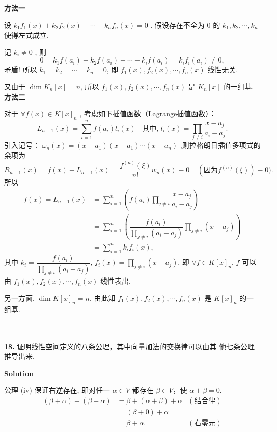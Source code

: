 \documentclass[11pt,a4paper,openany,oneside]{book}
\newcommand\Solution{\noindent\textbf{\textsf{Solution}}\par\medskip}
\begin{document}
\textbf{方法一} 

设 $ k_1f_1(x) + k_2f_2(x) + \cdots + k_nf_n(x) = 0 $ . 假设存在不全为 $ 0 $ 的 $ k_1, k_2, \cdots, k_n $ 使得左式成立. 

记 $ k_i \neq 0 $ , 则
 $$  0 =k_1f(a_i) + k_2f(a_i) + \cdots + k_if(a_i)  = k_if_i(a_i) \neq 0 ,$$ 
矛盾! 所以 $ k_1 = k_2 = \cdots = k_n = 0 $, 即 $ f_1(x), f_2(x), \cdots, f_n(x) $ 线性无关.

又由于 $ \dim  K_n[x] = n $, 所以 $ f_1(x), f_2(x), \cdots, f_n(x) $ 是 $ K_n[x] $ 的一组基. \\ 

\textbf{方法二}

对于 $ \forall f(x) \in K[x]_n $ , 考虑如下插值函数（Lagrange插值函数）：
 $$  L_{n-1}(x) = \sum\limits_{i=1}^nf(a_i)l_i(x) \ \ \ \ \text{其中, }l_i(x) = \prod\limits_{j \neq i} \dfrac{x-a_j}{a_i-a_j}.$$ 
引入记号： $ \omega_{n}(x) = (x-a_1)(x-a_1)\cdots(x-a_n) $ ,则拉格朗日插值多项式的余项为
 $$  R_{n-1}(x) = f(x) - L_{n-1}(x) = \dfrac{f^{(n)}(\xi)}{n!}w_n(x) \equiv 0 \ \ \ \ \ (\text{因为} f^{(n)}(\xi) ) \equiv 0) . $$ 
所以 
\begin{align*}
 f(x) = L_{n-1}(x) &= \sum\limits_{i=1}^n \left(f(a_i)\prod\limits_{j \neq i} \dfrac{x-a_j}{a_i-a_j}\right)\\ 
 &= \sum\limits_{i=1}^n \left( \dfrac{f(a_i)}{\prod\limits_{j \neq i} (a_i - a_j)} \prod\limits_{j \neq i} (x-a_j)\right) \\
 &= \sum\limits_{i=1}^n k_i f_i(x),
\end{align*}
其中 $ k_i =\dfrac{f(a_i)}{\prod\limits_{j \neq i} (a_i - a_j)} $, $ f_i(x) =\prod\limits_{j \neq i} (x - a_j)$, 即 $\forall f \in K[x]_n $, $f$ 可以由 $ f_1(x), f_2(x), \cdots, f_n(x) $ 线性表出.

另一方面, $ \dim K[x]_n = n $, 由此知  $f_1(x), f_2(x), \cdots, f_n(x)$  是 $ K[x]_n $ 的一组基.  \\ \\ \\


\begin{myexample}
	\textbf{18.} 证明线性空间定义的八条公理，其中向量加法的交换律可以由其
	他七条公理推导出来.
\end{myexample}
\Solution 
公理 (iv) 保证右逆存在, 即对任一 $\alpha\in V$ 都存在 $\beta\in V$，使 $\alpha +\beta = 0$.
\begin{align*}
(\beta+\alpha)+(\beta+\alpha)&=\beta+(\alpha+\beta)+\alpha&(\text{结合律})\\
&=(\beta+0)+\alpha&\\
&=\beta+\alpha. &(\text{右零元})
\end{align*}
\end{document}

